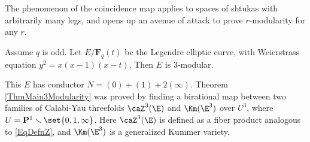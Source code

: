 \documentclass{article}
\def\F{\mathbf{F}}
\begin{document}
%
%


The phenomenon of the coincidence map applies to spaces of shtukas with arbitrarily many legs, and opens up an avenue of attack to prove $r$-modularity for any $r$.

\begin{thm} \label{ThmMain3Modularity} Assume $q$ is odd.  Let $E/\F_q(t)$ be the Legendre elliptic curve, with Weierstrass equation $y^2=x(x-1)(x-t)$.    Then $E$ is 3-modular.
\end{thm}

This $E$ has conductor $N=(0)+(1)+2(\infty)$.    Theorem \ref{ThmMain3Modularity} was proved by finding a birational map between two families of Calabi-Yau threefolds $\caZ^3(\E)$ and $\Km(\E^3)$ over $U^3$, where $U=\mathbf{P}^1\smallsetminus\set{0,1,\infty}$.  Here $\caZ^3(\E)$ is defined as a fiber product analogous to \eqref{EqDefnZ}, and $\Km(\E^3)$ is a generalized Kummer variety. 
\end{document}
